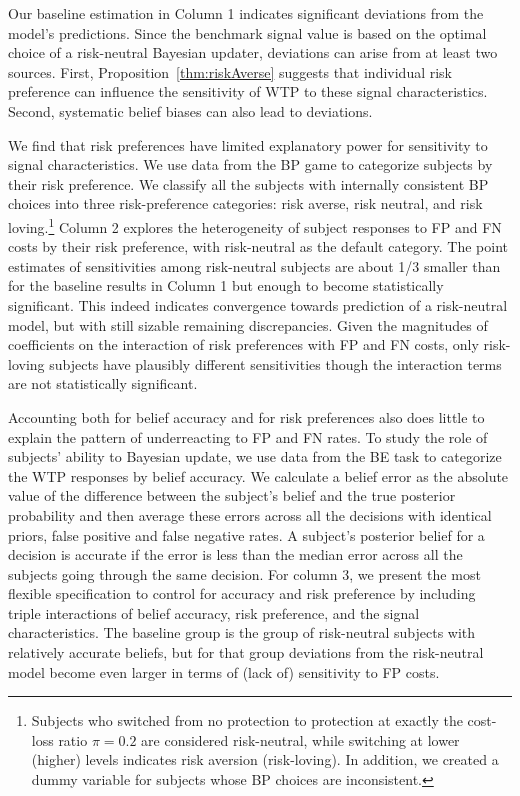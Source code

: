 \documentclass[12pt,a4paper]{article}
\begin{document}
Our baseline estimation in Column 1 indicates significant deviations from the model's predictions. Since the benchmark signal value is based on the optimal choice of a risk-neutral Bayesian updater, deviations can arise from at least two sources. First, Proposition~\ref{thm:riskAverse} suggests that individual risk preference can influence the sensitivity of WTP to these signal characteristics. Second, systematic belief biases can also lead to deviations. 

We find that risk preferences have limited explanatory power for sensitivity to signal characteristics. We use data from the BP game to categorize subjects by their risk preference. We classify all the subjects with internally consistent BP choices into three risk-preference categories: risk averse, risk neutral, and risk loving.\footnote{Subjects who switched from no protection to protection at exactly the cost-loss ratio $\pi=0.2$ are considered risk-neutral, while switching at lower (higher) levels indicates risk aversion (risk-loving). In addition, we created a dummy variable for subjects whose BP choices are inconsistent.}  Column 2 explores the heterogeneity of subject responses to FP and FN costs by their risk preference, with risk-neutral as the default category. The point estimates of sensitivities among risk-neutral subjects are about 1/3 smaller than for the baseline results in Column 1 but enough to become statistically significant. This indeed indicates convergence towards prediction of a risk-neutral model, but with still sizable remaining discrepancies. Given the magnitudes of coefficients on the interaction of risk preferences with FP and FN costs, only risk-loving subjects have plausibly different sensitivities though the interaction terms are not statistically significant.

Accounting both for belief accuracy and for risk preferences also does little to explain the pattern of underreacting to FP and FN rates. To study the role of subjects' ability to Bayesian update, we use data from the BE task to categorize the WTP responses by belief accuracy. We calculate a belief error as the absolute value of the difference between the subject's belief and the true posterior probability and then average these errors across all the decisions with identical priors, false positive and false negative rates. A subject's posterior belief for a decision is accurate if the error is less than the median error across all the subjects going through the same decision. For column 3, we present the most flexible specification to control for accuracy and risk preference by including triple interactions of belief accuracy, risk preference, and the signal characteristics. The baseline group is the group of risk-neutral subjects with relatively accurate beliefs, but for that group deviations from the risk-neutral model become even larger in terms of (lack of) sensitivity to FP costs.
\end{document}
